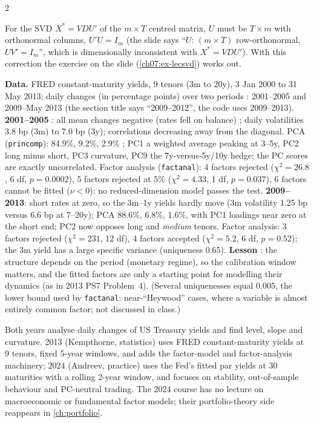 \begin{paracol}{2}
\begin{coursenote}
For the SVD $X^*=VDU'$ of the $m\times T$ centred matrix, $U$ must be $T\times m$ with orthonormal columns, $U'U=I_m$
(the slide says ``$U$: $(m\times T)$ row-orthonormal, $UV'=I_m$'', which is dimensionally inconsistent with
$X^*=VDU'$). With this correction the exercise on the slide (\cref{ch07:ex-lecsvd}) works out.
\end{coursenote}

\begin{casestudy}
\textbf{Data.} FRED constant-maturity yields, 9 tenors (3m to 20y), 3 Jan 2000 to 31 May 2013; daily changes (in
percentage points) over two periods : 2001--2005 and 2009--May 2013 (the section title says
``2009--2012'', the code uses 2009--2013).
\textbf{2001--2005} : all mean changes negative (rates fell on balance) ; daily
volatilities 3.8 bp (3m) to 7.0 bp (3y); correlations decreasing away from the diagonal. PCA (\texttt{princomp}):
84.9\%, 9.2\%, 2.9\% ; PC1 a weighted average peaking at 3--5y, PC2 long minus short, PC3
curvature, PC9 the 7y-versus-5y/10y hedge; the PC scores are exactly uncorrelated. Factor analysis
(\texttt{factanal}): 4 factors rejected ($\chi^2=26.8$, 6 df, $p=0.0002$), 5 factors rejected at 5\% ($\chi^2=4.33$, 1 df,
$p=0.037$), 6 factors cannot be fitted ($\nu<0$): no reduced-dimension model passes the test.
\textbf{2009--2013}: short rates at zero, so the 3m--1y yields hardly move (3m volatility 1.25 bp versus 6.6 bp at
7--20y); PCA 88.6\%, 6.8\%, 1.6\%, with PC1 loadings near zero at the short end; PC2 now opposes long and
\emph{medium} tenors. Factor analysis: 3 factors rejected ($\chi^2=231$, 12 df), 4 factors accepted ($\chi^2=5.2$, 6 df,
$p=0.52$); the 3m yield has a large specific variance (uniqueness 0.65).
\textbf{Lesson} : the structure depends on the period (monetary regime), so the calibration
window matters, and the fitted factors are only a starting point for modelling their dynamics (as in 2013 PS7
Problem~4). (Several uniquenesses equal 0.005, the lower bound used by \texttt{factanal}: near-``Heywood'' cases,
where a variable is almost entirely common factor; not discussed in class.)
\end{casestudy}

\begin{coursenote}[2013 versus 2024]
Both years analyse daily changes of US Treasury yields and find level, slope and curvature. 2013 (Kempthorne,
statistics) uses FRED constant-maturity yields at 9 tenors, fixed 5-year windows, and adds the factor-model and
factor-analysis machinery; 2024 (Andreev, practice) uses the Fed's fitted par yields at 30 maturities with a
rolling 2-year window, and focuses on stability, out-of-sample behaviour and PC-neutral trading. The 2024 course
has no lecture on macroeconomic or fundamental factor models; their portfolio-theory side reappears in
\cref{ch:portfolio}.
\end{coursenote}


\end{paracol}
